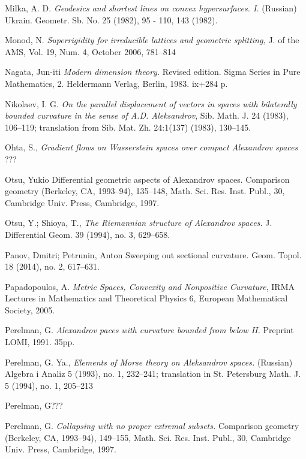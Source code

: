\begin{thebibliography}{52}
 Milka, A. D.  \textit{Geodesics and shortest lines on convex hypersurfaces.  I.}  (Russian)   Ukrain. Geometr. Sb. No. 25
(1982), 95 - 110, 143 (1982).

 Monod, N. \textit{Superrigidity for irreducible lattices and geometric splitting,} J. of the AMS,
Vol. 19, Num. 4, October 2006, 781--814

 Nagata, Jun-iti \textit{Modern dimension theory.} Revised edition. Sigma Series in Pure Mathematics, 2. Heldermann Verlag, Berlin, 1983. ix+284 p.

 Nikolaev, I. G. \textit{On the parallel displacement of vectors in spaces with
bilaterally bounded curvature in the sense of A.D. Aleksandrov}, Sib. Math.
J. 24 (1983), 106--119; translation from Sib. Mat. Zh. 24:1(137) (1983), 130--145.


 Ohta, S., \textit{Gradient flows on Wasserstein spaces
over compact Alexandrov spaces} ???

 Otsu, Yukio Differential geometric aspects of Alexandrov spaces.  Comparison
geometry (Berkeley, CA, 1993--94),  135--148, Math. Sci. Res. Inst. Publ., 30,
Cambridge Univ. Press, Cambridge, 1997.

 Otsu, Y.; Shioya, T., \textit{The Riemannian structure of Alexandrov spaces.}  J. Differential Geom.  39  (1994),  no. 3, 629--658.

Panov, Dmitri; Petrunin, Anton
Sweeping out sectional curvature. 
Geom. Topol. 18 (2014), no. 2, 617--631. 

  Papadopoulos, A.
\textit{Metric Spaces, Convexity and Nonpositive Curvature},
IRMA Lectures in Mathematics and Theoretical Physics 6, European Mathematical Society, 2005. 


 Perelman, G. \textit{Alexandrov paces with curvature
bounded from below II.} Preprint LOMI, 1991. 35pp.

Perelman, G. Ya., \textit{Elements of Morse theory on
Aleksandrov spaces.} (Russian)  Algebra i Analiz  5  (1993),  no. 1, 232--241; 
translation in  St. Petersburg Math. J.  5  (1994),  no. 1, 205--213

Perelman, G???

 Perelman, G. \textit{Collapsing with no proper extremal subsets.}  Comparison geometry (Berkeley, CA, 1993--94),  149--155,
Math. Sci. Res. Inst. Publ., 30, Cambridge Univ. Press, Cambridge, 1997.



\end{thebibliography}
